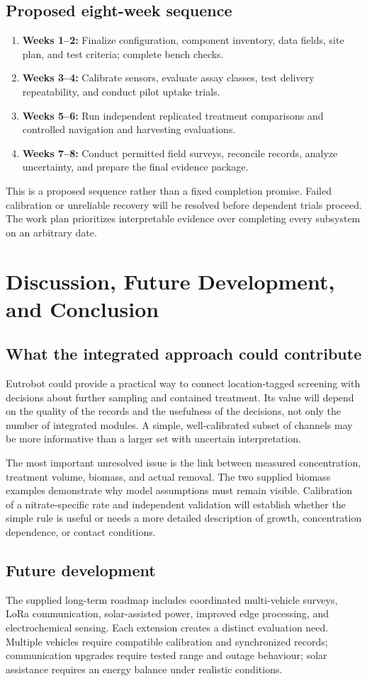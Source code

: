 \documentclass[12pt,a4paper]{article}
\newcommand{\papersection}[1]{\clearpage\section{#1}}
\begin{document}
\subsection{Proposed eight-week sequence}
\begin{enumerate}
\item \textbf{Weeks 1--2:} Finalize configuration, component inventory, data fields, site plan, and test criteria; complete bench checks.
\item \textbf{Weeks 3--4:} Calibrate sensors, evaluate assay classes, test delivery repeatability, and conduct pilot uptake trials.
\item \textbf{Weeks 5--6:} Run independent replicated treatment comparisons and controlled navigation and harvesting evaluations.
\item \textbf{Weeks 7--8:} Conduct permitted field surveys, reconcile records, analyze uncertainty, and prepare the final evidence package.
\end{enumerate}
This is a proposed sequence rather than a fixed completion promise. Failed calibration or unreliable recovery will be resolved before dependent trials proceed. The work plan prioritizes interpretable evidence over completing every subsystem on an arbitrary date.

\papersection{Discussion, Future Development, and Conclusion}
\subsection{What the integrated approach could contribute}
Eutrobot could provide a practical way to connect location-tagged screening with decisions about further sampling and contained treatment. Its value will depend on the quality of the records and the usefulness of the decisions, not only the number of integrated modules. A simple, well-calibrated subset of channels may be more informative than a larger set with uncertain interpretation.

The most important unresolved issue is the link between measured concentration, treatment volume, biomass, and actual removal. The two supplied biomass examples demonstrate why model assumptions must remain visible. Calibration of a nitrate-specific rate and independent validation will establish whether the simple rule is useful or needs a more detailed description of growth, concentration dependence, or contact conditions.

\subsection{Future development}
The supplied long-term roadmap includes coordinated multi-vehicle surveys, LoRa communication, solar-assisted power, improved edge processing, and electrochemical sensing. Each extension creates a distinct evaluation need. Multiple vehicles require compatible calibration and synchronized records; communication upgrades require tested range and outage behaviour; solar assistance requires an energy balance under realistic conditions.
\end{document}
